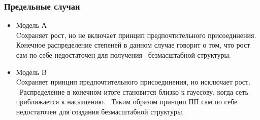 \frametitle{Предельные случаи}

\begin{itemize}[<+(1)->] 
    \item{Модель А}\\
    Cохраняет рост, но не включает принцип предпочтительного присоединения. \\
    Конечное распределение степеней в данном случае говорит о том, что рост сам по себе недостаточен для получения \
    безмасштабной структуры.

    \item{Модель B}\\
    Cохраняет принцип предпочтительного присоединения, но исключает рост. \
    Распределение в конечном итоге становится близко к гауссову, когда сеть приближается к насыщению. \
    Таким образом принцип ПП сам по себе недостаточен для создания безмасштабной структуры.

\end{itemize} 
